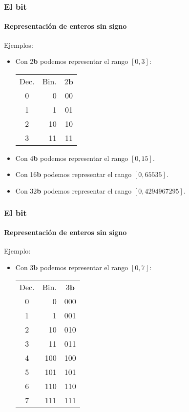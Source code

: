 \documentclass[11pt,a4paper,spanish]{beamer}
\newcommand{\bit}{\textbf{b}}
\begin{document}
\begin{frame}

\frametitle{El bit}
\framesubtitle{Representación de enteros sin signo}

    Ejemplos:
    \begin{itemize}
        \item Con 2\bit{} podemos representar el rango $[0,3]$:
        \begin{tabular}{c r c}
            Dec. & {\centering Bin.} & 2\bit\\
            0 & 0 & 00\\ \hline
            1 & 1 & 01\\ \hline
            2 & 10 & 10\\ \hline
            3 & 11 & 11\\
        \end{tabular}\pause
    \item Con 4\bit{} podemos representar el rango $[0,15]$.
    \item Con 16\bit{} podemos representar el rango $[0,65535]$.
    \item Con 32\bit{} podemos representar el rango $[0,4294967295]$.
    \end{itemize}

\end{frame}

\begin{frame}

\frametitle{El bit}
\framesubtitle{Representación de enteros sin signo}

    Ejemplo:
    \begin{itemize}
        \item Con 3\bit{} podemos representar el rango $[0,7]$:
        \begin{tabular}{c r c}
            Dec. & {\centering Bin.} & 3\bit\\
            0 &   0 & 000\\ \hline
            1 &   1 & 001\\ \hline
            2 &  10 & 010\\ \hline
            3 &  11 & 011\\ \hline
            4 & 100 & 100\\ \hline
            5 & 101 & 101\\ \hline
            6 & 110 & 110\\ \hline
            7 & 111 & 111\\
        \end{tabular}
    \end{itemize}

\end{frame}
\end{document}
